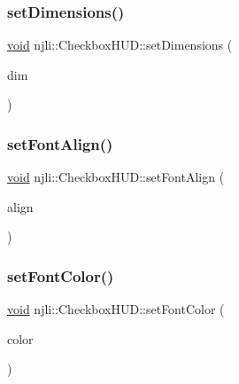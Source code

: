 \mbox{\label{classnjli_1_1_checkbox_h_u_d_a1f5298769d6467f4333a6fa208131ccd}} 
\subsubsection{\texorpdfstring{set\+Dimensions()}{setDimensions()}}
{\footnotesize\ttfamily \mbox{\hyperlink{_thread_8h_af1e856da2e658414cb2456cb6f7ebc66}{void}} njli\+::\+Checkbox\+H\+U\+D\+::set\+Dimensions (\begin{DoxyParamCaption}\item[{const bt\+Vector2 \&}]{dim }\end{DoxyParamCaption})}

\mbox{\label{classnjli_1_1_checkbox_h_u_d_ad910eaefd683c7809d908aa43aba1770}} 
\subsubsection{\texorpdfstring{set\+Font\+Align()}{setFontAlign()}}
{\footnotesize\ttfamily \mbox{\hyperlink{_thread_8h_af1e856da2e658414cb2456cb6f7ebc66}{void}} njli\+::\+Checkbox\+H\+U\+D\+::set\+Font\+Align (\begin{DoxyParamCaption}\item[{\mbox{\hyperlink{namespacenjli_a376c3102aef4710f2b54a545bf0e2b3a}{njli\+H\+U\+D\+Align}}}]{align }\end{DoxyParamCaption})}

\mbox{\label{classnjli_1_1_checkbox_h_u_d_a34ff2d255d4c683052a099f8207988ba}} 
\subsubsection{\texorpdfstring{set\+Font\+Color()}{setFontColor()}}
{\footnotesize\ttfamily \mbox{\hyperlink{_thread_8h_af1e856da2e658414cb2456cb6f7ebc66}{void}} njli\+::\+Checkbox\+H\+U\+D\+::set\+Font\+Color (\begin{DoxyParamCaption}\item[{const bt\+Vector4 \&}]{color }\end{DoxyParamCaption})}

